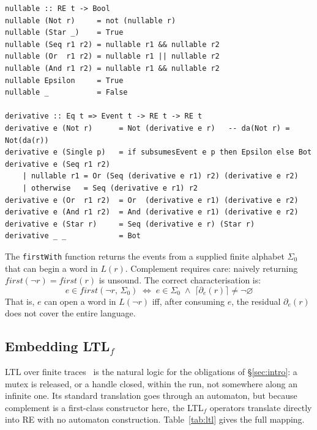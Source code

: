 \documentclass[acmsmall,screen]{acmart}
\newcommand{\norm}[1]{\lceil #1 \rceil}
\newcommand{\univ}{\neg\varnothing}
\begin{document}
\begin{lstlisting}
nullable :: RE t -> Bool
nullable (Not r)     = not (nullable r)
nullable (Star _)    = True
nullable (Seq r1 r2) = nullable r1 && nullable r2
nullable (Or  r1 r2) = nullable r1 || nullable r2
nullable (And r1 r2) = nullable r1 && nullable r2
nullable Epsilon     = True
nullable _           = False

derivative :: Eq t => Event t -> RE t -> RE t
derivative e (Not r)      = Not (derivative e r)   -- da(Not r) = Not(da(r))
derivative e (Single p)   = if subsumesEvent e p then Epsilon else Bot
derivative e (Seq r1 r2)
    | nullable r1 = Or (Seq (derivative e r1) r2) (derivative e r2)
    | otherwise   = Seq (derivative e r1) r2
derivative e (Or  r1 r2)  = Or  (derivative e r1) (derivative e r2)
derivative e (And r1 r2)  = And (derivative e r1) (derivative e r2)
derivative e (Star r)     = Seq (derivative e r) (Star r)
derivative _ _            = Bot
\end{lstlisting}

The \lstinline{firstWith} function returns the events from a supplied
finite alphabet $\Sigma_0$ that can begin a word in $L(r)$.
Complement requires care: naively returning $\mathit{first}(\neg r) =
\mathit{first}(r)$ is unsound.
The correct characterisation is:
\begin{equation}
  e \in \mathit{first}(\neg r,\,\Sigma_0)
  \;\iff\;
  e \in \Sigma_0
  \;\wedge\;
  \norm{\partial_e(r)} \neq \univ
  \label{eq:first-not}
\end{equation}
That is, $e$ can open a word in $L(\neg r)$ iff, after consuming $e$,
the residual $\partial_e(r)$ does not cover the entire language.

\subsection{Embedding LTL\texorpdfstring{$_f$}{f}}
\label{sec:ltl}

LTL over finite traces~\cite{degiacomo2013} is the natural logic for the
obligations of \S\ref{sec:intro}: a mutex is released, or a handle closed,
within the run, not somewhere along an infinite one.
Its standard translation goes through an automaton, but because complement
is a first-class constructor here, the LTL$_f$ operators translate directly
into RE with no automaton construction.
Table~\ref{tab:ltl} gives the full mapping.
\end{document}
